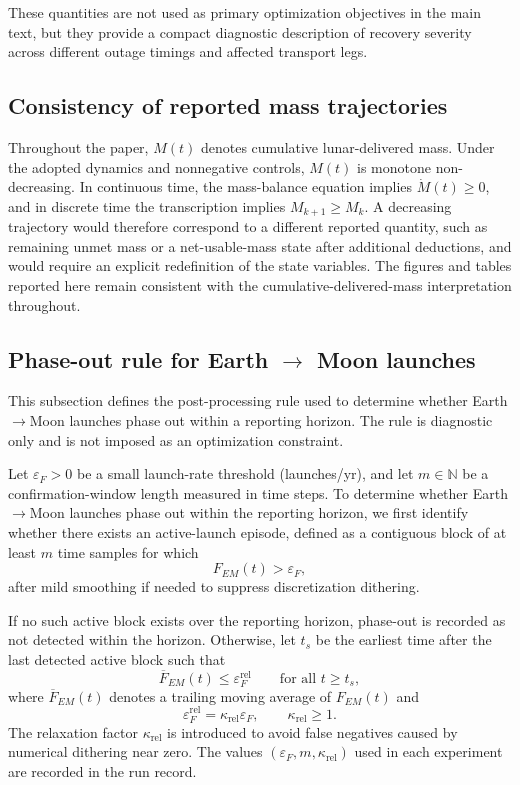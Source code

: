 \documentclass[12pt]{article}
\begin{document}
These quantities are not used as primary optimization objectives in the main text, but they provide a compact diagnostic description of recovery severity across different outage timings and affected transport legs.

\subsection{Consistency of reported mass trajectories}
\label{app:mass_monotonicity}

Throughout the paper, $M(t)$ denotes cumulative lunar-delivered mass. Under the adopted dynamics and nonnegative controls, $M(t)$ is monotone non-decreasing. In continuous time, the mass-balance equation implies $\dot M(t)\ge 0$, and in discrete time the transcription implies $M_{k+1}\ge M_k$. A decreasing trajectory would therefore correspond to a different reported quantity, such as remaining unmet mass or a net-usable-mass state after additional deductions, and would require an explicit redefinition of the state variables. The figures and tables reported here remain consistent with the cumulative-delivered-mass interpretation throughout.

\subsection{\texorpdfstring{Phase-out rule for Earth $\to$ Moon launches}{Phase-out rule for Earth -> Moon launches}}
\label{app:phaseout_year}

This subsection defines the post-processing rule used to determine whether Earth$\to$Moon launches phase out within a reporting horizon. The rule is diagnostic only and is not imposed as an optimization constraint.

Let $\varepsilon_F>0$ be a small launch-rate threshold (launches/yr), and let $m\in\mathbb{N}$ be a confirmation-window length measured in time steps. To determine whether Earth$\to$Moon launches phase out within the reporting horizon, we first identify whether there exists an active-launch episode, defined as a contiguous block of at least $m$ time samples for which
\[
F_{EM}(t)>\varepsilon_F,
\]
after mild smoothing if needed to suppress discretization dithering.

If no such active block exists over the reporting horizon, phase-out is recorded as not detected within the horizon. Otherwise, let $t_s$ be the earliest time after the last detected active block such that
\[
\overline{F}_{EM}(t)\le \varepsilon_F^{\mathrm{rel}}
\qquad \text{for all } t\ge t_s,
\]
where $\overline{F}_{EM}(t)$ denotes a trailing moving average of $F_{EM}(t)$ and
\[
\varepsilon_F^{\mathrm{rel}}=\kappa_{\mathrm{rel}}\varepsilon_F,
\qquad \kappa_{\mathrm{rel}}\ge 1.
\]
The relaxation factor $\kappa_{\mathrm{rel}}$ is introduced to avoid false negatives caused by numerical dithering near zero. The values $(\varepsilon_F,m,\kappa_{\mathrm{rel}})$ used in each experiment are recorded in the run record.
\end{document}
